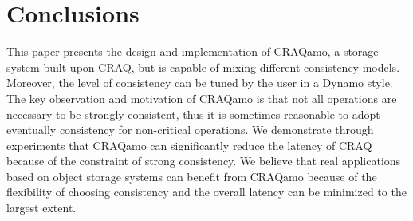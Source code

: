 \section{Conclusions}
This paper presents the design and implementation of CRAQamo, a storage system built upon CRAQ, but is capable of mixing different consistency models. Moreover, the level of consistency can be tuned by the user in a Dynamo style. The key observation and motivation of CRAQamo is that not all operations are necessary to be strongly consistent, thus it is sometimes reasonable to adopt eventually consistency for non-critical operations. We demonstrate through experiments that CRAQamo can significantly reduce the latency of CRAQ because of the constraint of strong consistency. We believe that real applications based on object storage systems can benefit from CRAQamo because of the flexibility of choosing consistency and the overall latency can be minimized to the largest extent.
\label{sec:conclusion}

